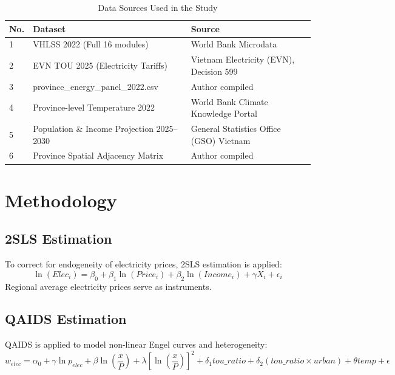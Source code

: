 \documentclass[12pt,a4paper]{article}
\begin{document}
	\begin{table}[H] 
		\centering
		\caption{Data Sources Used in the Study}
		\label{tab:data_sources}
		\begin{tabular}{lll}
			\toprule
			No. & Dataset & Source \\
			\midrule
			1 & VHLSS 2022 (Full 16 modules) & World Bank Microdata \\
			2 & EVN TOU 2025 (Electricity Tariffs) & Vietnam Electricity (EVN), Decision 599 \\
			3 & province\_energy\_panel\_2022.csv & Author compiled \\
			4 & Province-level Temperature 2022 & World Bank Climate Knowledge Portal \\
			5 & Population \& Income Projection 2025--2030 & General Statistics Office (GSO) Vietnam \\
			6 & Province Spatial Adjacency Matrix & Author compiled \\
			\bottomrule
		\end{tabular}
	\end{table}
	
	\section{Methodology}
	\subsection{2SLS Estimation}
	To correct for endogeneity of electricity prices, 2SLS estimation is applied:
	\[
	\ln(Elec_i) = \beta_0 + \beta_1 \ln(Price_i) + \beta_2 \ln(Income_i) + \gamma X_i + \epsilon_i
	\]
	Regional average electricity prices serve as instruments.
	
	\subsection{QAIDS Estimation}
	QAIDS is applied to model non-linear Engel curves and heterogeneity:
	\[
	w_{elec} = \alpha_0 + \gamma \ln p_{elec} + \beta \ln\left(\frac{x}{P}\right) + \lambda \left[\ln\left(\frac{x}{P}\right)\right]^2 + \delta_1 tou\_ratio + \delta_2 (tou\_ratio \times urban) + \theta temp + \epsilon
	\]
	
\end{document}
